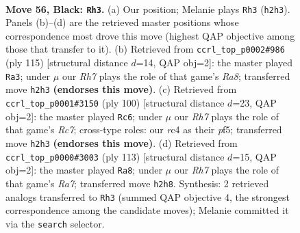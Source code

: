 \documentclass[11pt]{article}
\begin{document}
\clearpage

\begin{figure}[p]\centering
\begin{subfigure}{0.46\textwidth}\centering
\resizebox{\linewidth}{!}{%
\newchessgame
\chessboard[
  setfen={8/5p2/4p1k1/R7/P1R1P3/4KP2/7r/8 b - - 4 56},
  showmover=false,
  pgfstyle=straightmove, color=movearrow, markmove={h2-h3}
]}
\caption{}
\end{subfigure}\hfill
\begin{subfigure}{0.46\textwidth}\centering
\resizebox{\linewidth}{!}{%
\newchessgame
\chessboard[
  setfen={8/6k1/6p1/7p/5R1P/6P1/5PK1/r7 b - - 35 58},
  showmover=false,
  pgfstyle=straightmove, color=movearrow, markmove={a1-a3}
]}
\caption{}
\end{subfigure}
\\[4pt]
\begin{subfigure}{0.46\textwidth}\centering
\resizebox{\linewidth}{!}{%
\newchessgame
\chessboard[
  setfen={8/2R5/p4pk1/r4p2/7P/6P1/5PK1/8 w - - 1 51},
  showmover=false,
  pgfstyle=straightmove, color=movearrow, markmove={c7-c6}
]}
\caption{}
\end{subfigure}\hfill
\begin{subfigure}{0.46\textwidth}\centering
\resizebox{\linewidth}{!}{%
\newchessgame
\chessboard[
  setfen={6k1/6p1/7p/7P/5RP1/5PK1/r7/8 b - - 12 57},
  showmover=false,
  pgfstyle=straightmove, color=movearrow, markmove={a2-a8}
]}
\caption{}
\end{subfigure}
\caption{\textbf{Move 56, Black: \texttt{Rh3}.} (a) Our position; Melanie plays \texttt{Rh3} (\texttt{h2h3}). Panels (b)--(d) are the retrieved master positions whose correspondence most drove this move (highest QAP objective among those that transfer to it). (b) Retrieved from \texttt{ccrl\_top\_p0002\#986} (ply 115) [structural distance $d$=14, QAP obj=2]: the master played \texttt{Ra3}; under $\mu$ our \emph{Rh7} plays the role of that game's \emph{Ra8}; transferred move \texttt{h2h3} \textbf{(endorses this move)}. (c) Retrieved from \texttt{ccrl\_top\_p0001\#3150} (ply 100) [structural distance $d$=23, QAP obj=2]: the master played \texttt{Rc6}; under $\mu$ our \emph{Rh7} plays the role of that game's \emph{Rc7}; cross-type roles: our \emph{r}c4 as their \emph{p}f5; transferred move \texttt{h2h3} \textbf{(endorses this move)}. (d) Retrieved from \texttt{ccrl\_top\_p0000\#3003} (ply 113) [structural distance $d$=15, QAP obj=2]: the master played \texttt{Ra8}; under $\mu$ our \emph{Rh7} plays the role of that game's \emph{Ra7}; transferred move \texttt{h2h8}. Synthesis: 2 retrieved analogs transferred to \texttt{Rh3} (summed QAP objective 4, the strongest correspondence among the candidate moves); Melanie committed it via the \texttt{search} selector.}
\label{fig:thought-m111}
\end{figure}
\end{document}
